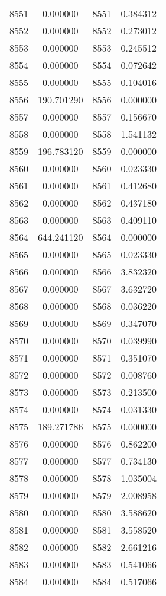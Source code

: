 \documentclass[12pt]{article}
\begin{document}
\begin{longtable}{@{}cccc@{}}
8551 & 0.000000 & 8551 & 0.384312 \\
8552 & 0.000000 & 8552 & 0.273012 \\
8553 & 0.000000 & 8553 & 0.245512 \\
8554 & 0.000000 & 8554 & 0.072642 \\
8555 & 0.000000 & 8555 & 0.104016 \\
8556 & 190.701290 & 8556 & 0.000000 \\
8557 & 0.000000 & 8557 & 0.156670 \\
8558 & 0.000000 & 8558 & 1.541132 \\
8559 & 196.783120 & 8559 & 0.000000 \\
8560 & 0.000000 & 8560 & 0.023330 \\
8561 & 0.000000 & 8561 & 0.412680 \\
8562 & 0.000000 & 8562 & 0.437180 \\
8563 & 0.000000 & 8563 & 0.409110 \\
8564 & 644.241120 & 8564 & 0.000000 \\
8565 & 0.000000 & 8565 & 0.023330 \\
8566 & 0.000000 & 8566 & 3.832320 \\
8567 & 0.000000 & 8567 & 3.632720 \\
8568 & 0.000000 & 8568 & 0.036220 \\
8569 & 0.000000 & 8569 & 0.347070 \\
8570 & 0.000000 & 8570 & 0.039990 \\
8571 & 0.000000 & 8571 & 0.351070 \\
8572 & 0.000000 & 8572 & 0.008760 \\
8573 & 0.000000 & 8573 & 0.213500 \\
8574 & 0.000000 & 8574 & 0.031330 \\
8575 & 189.271786 & 8575 & 0.000000 \\
8576 & 0.000000 & 8576 & 0.862200 \\
8577 & 0.000000 & 8577 & 0.734130 \\
8578 & 0.000000 & 8578 & 1.035004 \\
8579 & 0.000000 & 8579 & 2.008958 \\
8580 & 0.000000 & 8580 & 3.588620 \\
8581 & 0.000000 & 8581 & 3.558520 \\
8582 & 0.000000 & 8582 & 2.661216 \\
8583 & 0.000000 & 8583 & 0.541066 \\
8584 & 0.000000 & 8584 & 0.517066 \\

\end{longtable}
\end{document}
